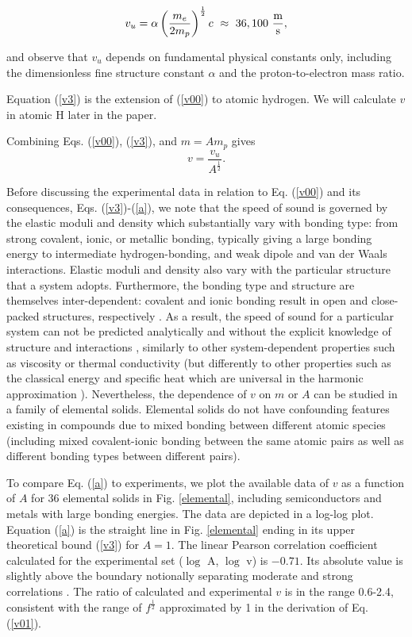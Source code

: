 \documentclass[aps,prl,groupedaddress,fleqn,twocolumn,10pt]{revtex4}
\begin{document}
\begin{equation}
v_u=\alpha\left(\frac{m_e}{2m_p}\right)^{\frac{1}{2}}c~\approx~36,100~\frac{\rm m}{\rm s},
\label{v3}
\end{equation}

\noindent and observe that $v_u$ depends on fundamental physical constants only, including the dimensionless fine structure constant $\alpha$ and the proton-to-electron mass ratio.

Equation (\ref{v3}) is the extension of (\ref{v00}) to atomic hydrogen. We will calculate $v$ in atomic H later in the paper.

Combining Eqs. (\ref{v00}), (\ref{v3}), and $m=Am_p$ gives
\begin{equation}
v=\frac{v_u}{A^\frac{1}{2}}.
\label{a}
\end{equation}

Before discussing the experimental data in relation to Eq. (\ref{v00}) and its consequences, Eqs. (\ref{v3})-(\ref{a}), we note that the speed of sound is governed by the elastic moduli and density which substantially vary with bonding type: from strong covalent, ionic, or metallic bonding, typically giving a large bonding energy to intermediate hydrogen-bonding, and weak dipole and van der Waals interactions. Elastic moduli and density also vary with the particular structure that a system adopts. Furthermore, the bonding type and structure are themselves inter-dependent: covalent and ionic bonding result in open and close-packed structures, respectively \cite{phillips}. As a result, the speed of sound for a particular system can not be predicted analytically and without the explicit knowledge of structure and interactions \cite{zaccone}, similarly to other system-dependent properties such as viscosity or thermal conductivity (but differently to other properties such as the classical energy and specific heat which are universal in the harmonic approximation \cite{landau}). Nevertheless, the dependence of $v$ on $m$ or $A$ can be studied in a family of elemental solids. Elemental solids do not have confounding features existing in compounds due to mixed bonding between different atomic species (including mixed covalent-ionic bonding between the same atomic pairs as well as different bonding types between different pairs).

To compare Eq. (\ref{a}) to experiments, we plot the available data of $v$ as a function of $A$ for 36 elemental solids \cite{handbook,handbook1,handbook2} in Fig. \ref{elemental}, including semiconductors and metals with large bonding energies. The data are depicted in a log-log plot. Equation (\ref{a}) is the straight line in Fig. \ref{elemental} ending in its upper theoretical bound (\ref{v3}) for $A=1$. The linear Pearson correlation coefficient calculated for the experimental set ($\log$ A, $\log$ v) is $-0.71$. Its absolute value is slightly above the boundary notionally separating moderate and strong correlations \cite{correlation}. The ratio of calculated and experimental $v$ is in the range 0.6-2.4, consistent with the range of $f^\frac{1}{2}$ approximated by 1 in the derivation of Eq. (\ref{v01}).
\end{document}
